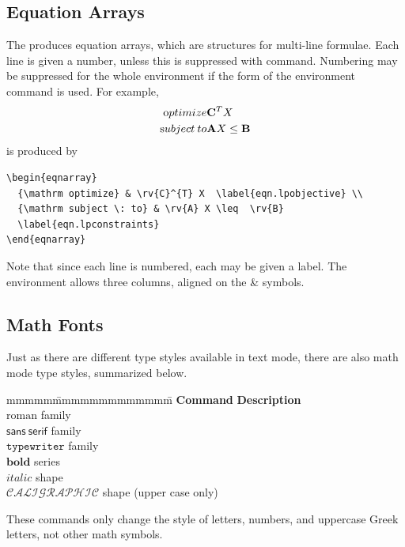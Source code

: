 \subsection{Equation Arrays}
The  produces equation arrays, which are structures for multi-line formulae.
Each line is given a number, unless this is suppressed with  command.
Numbering may be suppressed for the whole environment if the  form of the environment command is used.
For example,
\begin{eqnarray}
  {\mathrm optimize} & \mathbf{C}^{T} X  \label{eqn.lpobjective} \\
  {\mathrm subject \: to} & \mathbf{A} X \leq  \mathbf{B} 
  \label{eqn.lpconstraints}
\end{eqnarray}
is produced by 
\begin{verbatim}
\begin{eqnarray}
  {\mathrm optimize} & \rv{C}^{T} X  \label{eqn.lpobjective} \\
  {\mathrm subject \: to} & \rv{A} X \leq  \rv{B} 
  \label{eqn.lpconstraints}
\end{eqnarray}
\end{verbatim}
Note that since each line is numbered, each may be given a label.
The  environment allows three columns, aligned on the \& symbols.
\subsection{Math Fonts}
\label{ssec.mathfonts}
Just as there are different type styles available in text mode, there are also math mode type styles, summarized below.
\begin{tabbing}
mmmmm\=mmmmmmmmmmmmm\= \kill
\>\textbf{Command} \>\textbf{Description} \\
\> \>$\mathrm{roman}$ family\\
\> \>$\mathsf{sans \: serif}$ family\\
\> \>$\mathtt{typewriter}$ family\\
\> \>$\mathbf{bold}$ series\\
\> \>$\mathit{italic}$ shape\\
\> \>$\mathcal{CALIGRAPHIC}$ shape (upper case only)
\end{tabbing}
These commands only change the style of letters, numbers, and uppercase Greek letters, not other math symbols.
